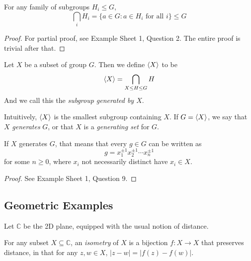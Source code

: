 \documentclass[12pt]{article}
\begin{document}
\begin{prop}
    For any family of subgroups $H_i \le G$,
    \[
        \bigcap_i H_i = \{a \in G : a \in H_i \text{ for all } i\} \le G
    \]
\end{prop}
\begin{proof}
    For partial proof, see Example Sheet 1, Question 2.
    The entire proof is trivial after that.
\end{proof}

\begin{definition}
    Let $X$ be a subset of group $G$. Then
    we define $\langle{X}\rangle$ to be
    \[
        \langle{X}\rangle = \bigcap_{X \le H \le G} H
    \]
    And we call this the \emph{subgroup generated by $X$}.
\end{definition}
Intuitively, $\langle{X}\rangle$ is the smallest subgroup
containing $X$.
If $G = \langle{X}\rangle$, we say that $X$ \emph{generates} $G$,
or that $X$ is a \emph{generating set} for $G$.

\begin{prop}
    If $X$ generates $G$, that means that every $g \in G$
    can be written as
    \[
    g = x_{1}^{\pm 1}x_{2}^{\pm 1}\cdots x_{n}^{\pm 1}
    \]
    for some $n \ge 0$, where $x_i$ not necessarily distinct have $x_i \in X$.
\end{prop}
\begin{proof}
    See Example Sheet 1, Question 9.
\end{proof}

\subsection{Geometric Examples}

Let $\mathbb{C}$ be the 2D plane, 
equipped with the usual notion of distance.


\begin{definition}
    For any subset $X \subseteq \mathbb{C}$,
    an \emph{isometry} of $X$ is a bijection
    $f : X \to X$ that preserves distance,
    in that for any $z,w \in X$,
    $|z-w| = |f(z)-f(w)|$.
\end{definition}
\end{document}
